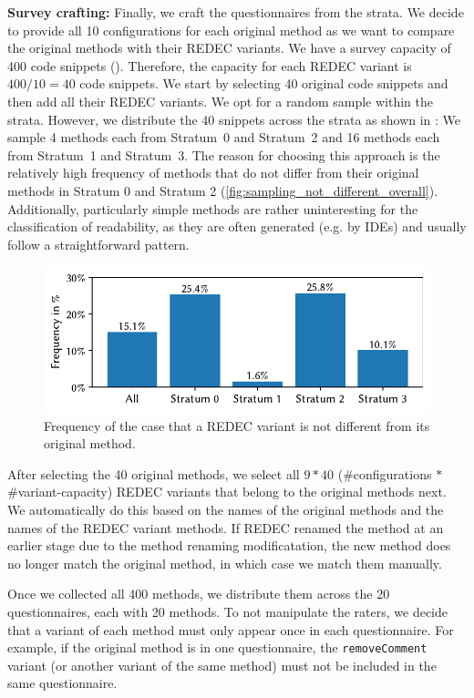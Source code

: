 \documentclass[%
class=scrreprt,
chapterprefix=false,%
open=right,%
twoside=false,%
paper=a4,%
logofile={Logo\_zentral\_farbig\_EN.png},%
thesistype=master,%
UKenglish,%
]{se2thesis}
\theoremstyle{definition}
\newcommand{\mod}{modificatation\xspace}
\newcommand{\rdh}{REDEC\xspace}
\begin{document}
	\textbf{Survey crafting:} Finally, we craft the questionnaires from the strata. We decide to provide all 10 configurations for each original method as we want to compare the original methods with their \rdh variants. We have a survey capacity of 400 code snippets (). Therefore, the capacity for each \rdh variant is $400/10 = 40$ code snippets. We start by selecting 40 original code snippets and then add all their \rdh variants.
	We opt for a random sample within the strata. However, we distribute the 40 snippets across the strata as shown in :
	We sample 4 methods each from Stratum~0 and Stratum~2 and 16 methods each from Stratum~1 and Stratum~3.
	The reason for choosing this approach is the relatively high frequency of methods that do not differ from their original methods in Stratum 0 and Stratum 2 (\autoref{fig:sampling_not_different_overall}). Additionally, particularly simple methods are rather uninteresting for the classification of readability, as they are often generated (e.g. by IDEs) and usually follow a straightforward pattern.
	
	\begin{figure}[tb]
		\centering
		\includegraphics[width=\textwidth]{img/sampling_not_different_overall_ylim.pdf}
		\caption{Frequency of the case that a \rdh variant is not different from its original method.} 
		\label{fig:sampling_not_different_overall}
	\end{figure}
		
	After selecting the 40 original methods, we select all $9*40$ (\#configurations $*$ \#variant-capacity) \rdh variants that belong to the original methods next. We automatically do this based on the names of the original methods and the names of the \rdh variant methods. If \rdh renamed the method at an earlier stage due to the method renaming \mod, the new method does no longer match the original method, in which case we match them manually.
		
	Once we collected all 400 methods, we distribute them across the 20 questionnaires, each with 20 methods. To not manipulate the raters, we decide that a variant of each method must only appear once in each questionnaire. For example, if the original method is in one questionnaire, the \texttt{removeComment} variant (or another variant of the same method) must not be included in the same questionnaire.
		
\end{document}

